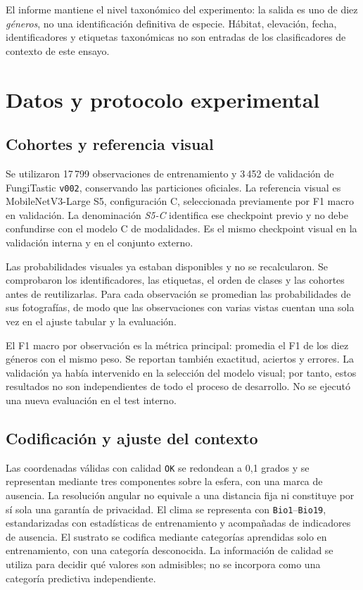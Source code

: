 \documentclass[11pt,a4paper]{article}
\begin{document}
El informe mantiene el nivel taxonómico del experimento: la salida es uno de
diez \emph{géneros}, no una identificación definitiva de especie. Hábitat,
elevación, fecha, identificadores y etiquetas taxonómicas no son entradas de
los clasificadores de contexto de este ensayo.

\section{Datos y protocolo experimental}
\subsection{Cohortes y referencia visual}
Se utilizaron 17\,799 observaciones de entrenamiento y 3\,452 de validación
de FungiTastic \texttt{v002}, conservando las particiones oficiales. La
referencia visual es MobileNetV3-Large S5, configuración C, seleccionada
previamente por F1 macro en validación. La denominación \emph{S5-C} identifica
ese checkpoint previo y no debe confundirse con el modelo C de modalidades.
Es el mismo checkpoint visual en la validación interna y en el conjunto externo.

Las probabilidades visuales ya estaban disponibles y no se recalcularon. Se
comprobaron los identificadores, las etiquetas, el orden de clases y las
cohortes antes de reutilizarlas. Para cada observación se promedian las
probabilidades de sus fotografías, de modo que las observaciones con varias
vistas cuentan una sola vez en el ajuste tabular y la evaluación.

El F1 macro por observación es la métrica principal: promedia el F1 de los diez
géneros con el mismo peso. Se reportan también exactitud, aciertos y errores.
La validación ya había intervenido en la selección del modelo visual; por
tanto, estos resultados no son independientes de todo el proceso de desarrollo.
No se ejecutó una nueva evaluación en el test interno.

\subsection{Codificación y ajuste del contexto}
Las coordenadas válidas con calidad \texttt{OK} se redondean a 0,1 grados y se
representan mediante tres componentes sobre la esfera, con una marca de
ausencia. La resolución angular no equivale a una distancia fija ni constituye
por sí sola una garantía de privacidad. El clima se representa con
\texttt{Bio1}--\texttt{Bio19}, estandarizadas con estadísticas de entrenamiento
y acompañadas de indicadores de ausencia. El sustrato se codifica mediante
categorías aprendidas solo en entrenamiento, con una categoría desconocida.
La información de calidad se utiliza para decidir qué valores son admisibles;
no se incorpora como una categoría predictiva independiente.
\end{document}
